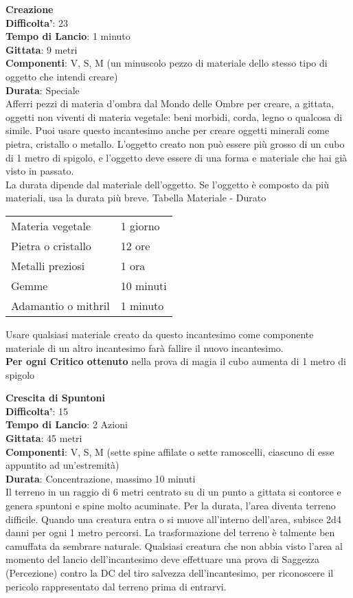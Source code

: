 \begin{multicols}{2}
\medskip\textbf{Creazione}\\
\textbf{Difficolta'}: 23\\
\textbf{Tempo di Lancio}: 1 minuto\\
\textbf{Gittata}: 9 metri\\
\textbf{Componenti}: V, S, M (un minuscolo pezzo di materiale dello stesso tipo di oggetto che intendi creare) \\
\textbf{Durata}: Speciale\\
Afferri pezzi di materia d’ombra dal Mondo delle Ombre per creare, a gittata, oggetti non viventi di materia vegetale: beni morbidi, corda, legno o qualcosa di simile. Puoi usare questo incantesimo anche per creare oggetti minerali come pietra, cristallo o metallo. L’oggetto creato non può essere più grosso di un cubo di 1 metro di spigolo, e l’oggetto deve essere di una forma e materiale che hai già visto in passato.\\
La durata dipende dal materiale dell’oggetto. Se l’oggetto è composto da più materiali, usa la durata più breve.
\medskip
Tabella Materiale - Durato
\medskip

\begin{tabularx}{0.45\textwidth}{lX}
	\hline 
Materia vegetale &1 giorno\\
Pietra o cristallo &12 ore\\
Metalli preziosi &1 ora\\
Gemme &10 minuti\\
Adamantio o mithril &1 minuto\\
\end{tabularx} 
\medskip

Usare qualsiasi materiale creato da questo incantesimo come componente materiale di un altro incantesimo farà fallire il nuovo incantesimo.\\
\textbf{Per ogni Critico ottenuto} nella prova di magia il cubo aumenta di 1 metro di spigolo

\medskip\textbf{Crescita di Spuntoni}\\
\textbf{Difficolta'}: 15\\
\textbf{Tempo di Lancio}: 2 Azioni\\
\textbf{Gittata}: 45 metri\\
\textbf{Componenti}: V, S, M (sette spine affilate o sette ramoscelli, ciascuno di esse appuntito ad un’estremità)\\
\textbf{Durata}: Concentrazione, massimo 10 minuti\\
Il terreno in un raggio di 6 metri centrato su di un punto a gittata si contorce e genera spuntoni e spine molto acuminate. Per la durata, l’area diventa terreno difficile. Quando una creatura entra o si muove all’interno dell’area, subisce 2d4 danni per ogni 1 metro percorsi.
La trasformazione del terreno è talmente ben camuffata da sembrare naturale. Qualsiasi creatura che non abbia visto l’area al momento del lancio dell’incantesimo deve effettuare una prova di Saggezza (Percezione) contro la DC del tiro salvezza dell’incantesimo, per riconoscere il pericolo rappresentato dal terreno prima di entrarvi. 


\end{multicols}
